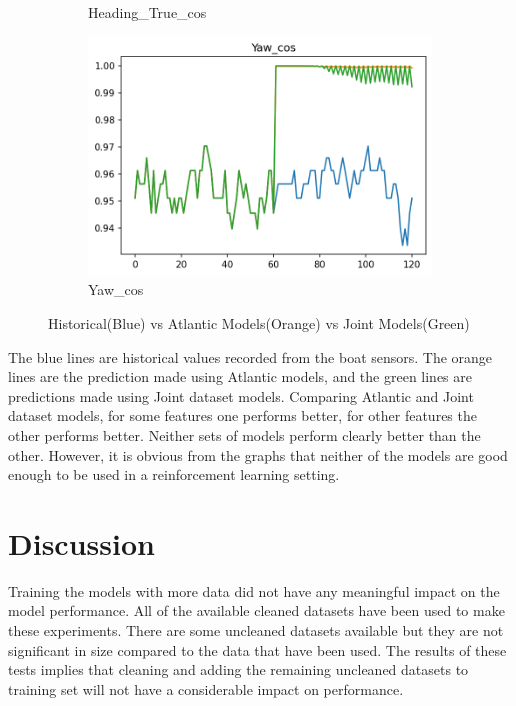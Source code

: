 \documentclass[12pt,twoside]{report}
\begin{document}
\begin{figure}[h]
\begin{subfigure}[b]{0.32\textwidth}
         \caption{Heading\_True\_cos}
     \end{subfigure}
     \begin{subfigure}[b]{0.32\textwidth}
         \centering
         \includegraphics[width=\textwidth]{figures/prediction-plots-joint/Yaw_cos.png}
         \caption{Yaw\_cos}
     \end{subfigure}
        \caption{Historical(Blue) vs Atlantic Models(Orange) vs Joint Models(Green)}
        \label{fig:prediction-joint}
\end{figure}

The blue lines are historical values recorded from the boat sensors. The orange lines are the prediction made using Atlantic models, and the green lines are predictions made using Joint dataset models. Comparing Atlantic and Joint dataset models, for some features one performs better, for other features the other performs better. Neither sets of models perform clearly better than the other. However, it is obvious from the graphs that neither of the models are good enough to be used in a reinforcement learning setting.

\section{Discussion}
Training the models with more data did not have any meaningful impact on the model performance. All of the available cleaned datasets have been used to make these experiments. There are some uncleaned datasets available but they are not significant in size compared to the data that have been used. The results of these tests implies that cleaning and adding the remaining uncleaned datasets to training set will not have a considerable impact on performance.
\end{document}
